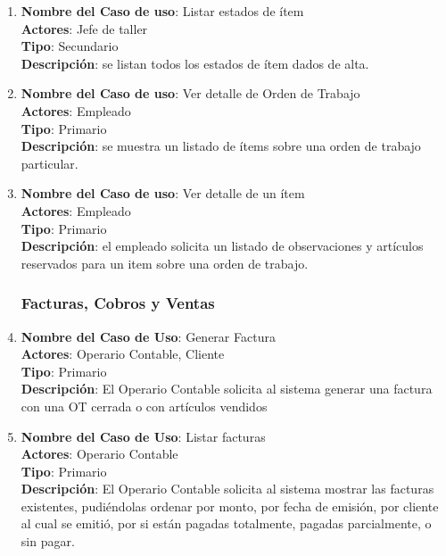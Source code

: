 \documentclass[12pt]{extarticle}
\begin{document}
\begin{spacing}{1.2}
\begin{enumerate}
            \item 	\textbf{Nombre del Caso de uso}: Listar estados de ítem\\
                    \textbf{Actores}: Jefe de taller\\
                    \textbf{Tipo}: Secundario\\
                    \textbf{Descripción}: se listan todos los estados de ítem dados de alta.

            \item 	\textbf{Nombre del Caso de uso}: Ver detalle de Orden de Trabajo\\
                    \textbf{Actores}: Empleado\\
                    \textbf{Tipo}: Primario\\
                    \textbf{Descripción}: se muestra un listado de ítems sobre una orden de trabajo particular.

            \item 	\textbf{Nombre del Caso de uso}: Ver detalle de un ítem\\
                    \textbf{Actores}: Empleado\\
                    \textbf{Tipo}: Primario\\
                    \textbf{Descripción}: el empleado solicita un listado de observaciones y artículos reservados para un item sobre una orden de trabajo.



            \subsubsection{Facturas, Cobros y Ventas}



            \item 	\textbf{Nombre del Caso de Uso}: Generar Factura\\
                    \textbf{Actores}: Operario Contable, Cliente\\
                    \textbf{Tipo}: Primario\\
                    \textbf{Descripción}: El Operario Contable solicita al sistema generar una factura con una OT cerrada o con artículos vendidos

            \item 	\textbf{Nombre del Caso de Uso}: Listar facturas\\
                    \textbf{Actores}: Operario Contable\\
                    \textbf{Tipo}: Primario\\
                    \textbf{Descripción}: El Operario Contable solicita al sistema mostrar las facturas existentes, pudiéndolas ordenar por monto, por fecha de emisión, por cliente al cual se emitió, por si están pagadas totalmente, pagadas parcialmente, o sin pagar.


\end{enumerate}
\end{spacing}
\end{document}
